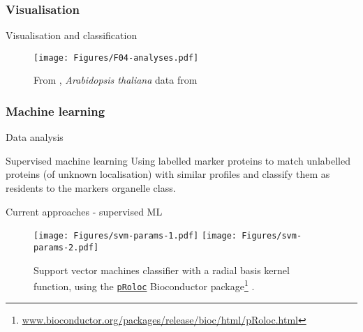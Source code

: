 \subsubsection*{Visualisation}
\label{sec:viz}

\begin{frame}{Visualisation and classification}
  \begin{figure}
    \centering
    \texttt{[image: Figures/F04-analyses.pdf]}
    \caption{From \cite{Gatto:2010}, \textit{Arabidopsis thaliana} data
      from \cite{Dunkley:2006}}
  \end{figure}   
\end{frame}

\subsubsection*{Machine learning}
\label{sec:ml}

\begin{frame}{Data analysis}
  \begin{centering}

    \begin{block}{Supervised machine learning}    
      Using labelled marker proteins to match unlabelled proteins (of
      unknown localisation) with similar profiles and classify them as
      residents to the markers organelle class.
    \end{block}
  \end{centering}
\end{frame}


\begin{frame}{Current approaches - supervised ML}
  \begin{figure}[h]
    \centering 
    \texttt{[image: Figures/svm-params-1.pdf]}
    \texttt{[image: Figures/svm-params-2.pdf]}    
    \caption{Support vector machines classifier with a radial basis
      kernel function, using the
      \href{http://bioconductor.org/packages/release/bioc/html/pRoloc.html}{\texttt{pRoloc}}
      Bioconductor package\footnote{\tiny
        \url{www.bioconductor.org/packages/release/bioc/html/pRoloc.html}}
      \citep{Gatto:2014}.}
  \end{figure}
\end{frame}


